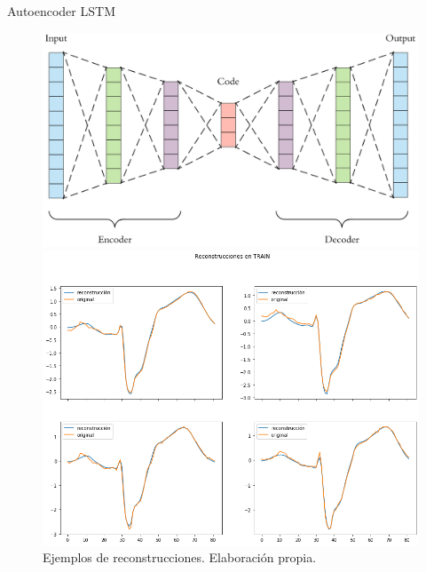 \documentclass[spanish]{beamer}
\begin{document}
\begin{frame}{Autoencoder LSTM}
  \begin{figure}[ht]
    \centering
    \begin{minipage}[b]{.45\textwidth}
      \centering
      \includegraphics[width=1\linewidth]{img/ae}
      \caption{Arquitectura autoencoder. Extraído de \href{http://www.cs.us.es/~fsancho/?e=232}{[enlace]}.}
    \end{minipage}
    \hspace{0.5cm}
    \begin{minipage}[b]{.45\textwidth}
      \centering
      \includegraphics[width=1\linewidth]{img/ae-reconstruccion}
      \caption{Ejemplos de reconstrucciones. Elaboración propia.}
    \end{minipage}
  \end{figure}
\end{frame}
\end{document}
